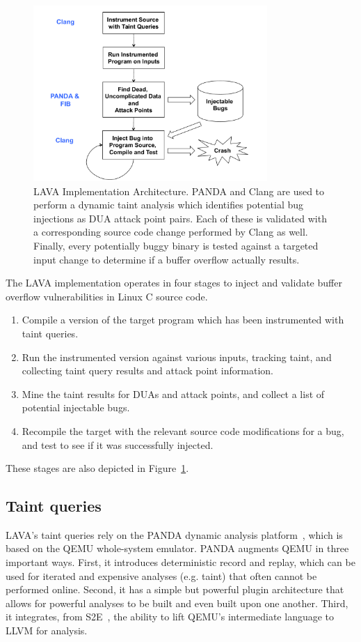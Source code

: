 
\begin{figure}
\centering
\includegraphics[width=3.5in]{lava-arch.pdf}
\caption{LAVA Implementation Architecture.  PANDA and Clang  are used to perform a dynamic taint analysis which identifies potential bug injections as DUA attack point pairs.
Each of these is validated with a corresponding source code change performed by Clang  as well.
Finally, every potentially buggy binary is tested against a targeted input change to determine if a buffer overflow actually results.}
\label{fig:lava-impl}
\end{figure}


The LAVA implementation operates in four stages to inject and validate buffer overflow vulnerabilities in Linux C source code. 

\begin{enumerate}
\item Compile a version of the target program which has been instrumented with taint queries.
\item Run the instrumented version against various inputs, tracking taint, and collecting taint query results and attack point information.
\item Mine the taint results for DUAs and attack points, and collect a list of potential injectable bugs.
\item Recompile the target with the relevant source code modifications for a bug, and test to see if it was successfully injected.
\end{enumerate}

These stages are also depicted in Figure~\ref{fig:lava-impl}.

\subsection{Taint queries}
LAVA's taint queries rely on the PANDA dynamic analysis platform~\cite{PANDA}, which is based on the QEMU whole-system emulator.
PANDA augments QEMU in three important ways.
First, it introduces deterministic record and replay, which can be used for iterated and expensive analyses (e.g. taint) that often cannot be performed online.
Second, it has a simple but powerful plugin architecture that allows for powerful analyses to be built and even built upon one another.
Third, it integrates, from S2E~\cite{S2E}, the ability to lift QEMU's intermediate language to LLVM for analysis.

